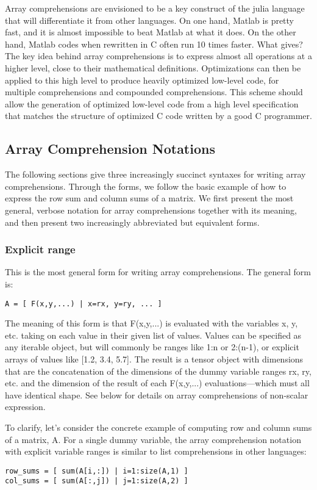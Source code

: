 \documentclass{article}
\begin{document}
Array comprehensions are envisioned to be a key construct of the julia
language that will differentiate it from other languages. On one hand,
Matlab is pretty fast, and it is almost impossible to beat Matlab at
what it does. On the other hand, Matlab codes when rewritten in C
often run 10 times faster. What gives? The key idea behind array
comprehensions is to express almost all operations at a higher level,
close to their mathematical definitions. Optimizations can then be
applied to this high level to produce heavily optimized low-level
code, for multiple comprehensions and compounded comprehensions. This
scheme should allow the generation of optimized low-level code from a
high level specification that matches the structure of optimized C
code written by a good C programmer.

\subsection{Array Comprehension Notations}

The following sections give three increasingly succinct syntaxes for writing array comprehensions. Through the forms, we follow the basic example of how to express the row sum and column sums of a matrix. We first present the most general, verbose notation for array comprehensions together with its meaning, and then present two increasingly abbreviated but equivalent forms.

\subsubsection{Explicit range}
This is the most general form for writing array comprehensions. The general form is:
\begin{verbatim}
A = [ F(x,y,...) | x=rx, y=ry, ... ]
\end{verbatim}

The meaning of this form is that F(x,y,...) is evaluated with the
variables x, y, etc. taking on each value in their given list of
values. Values can be specified as any iterable object, but will
commonly be ranges like 1:n or 2:(n-1), or explicit arrays of values
like [1.2, 3.4, 5.7]. The result is a tensor object with dimensions
that are the concatenation of the dimensions of the dummy variable
ranges rx, ry, etc. and the dimension of the result of each F(x,y,...)
evaluations—which must all have identical shape. See below for details
on array comprehensions of non-scalar expression.

To clarify, let's consider the concrete example of computing row and
column sums of a matrix, A. For a single dummy variable, the array
comprehension notation with explicit variable ranges is similar to
list comprehensions in other languages:
\begin{verbatim}
row_sums = [ sum(A[i,:]) | i=1:size(A,1) ]
col_sums = [ sum(A[:,j]) | j=1:size(A,2) ]
\end{verbatim}
\end{document}
